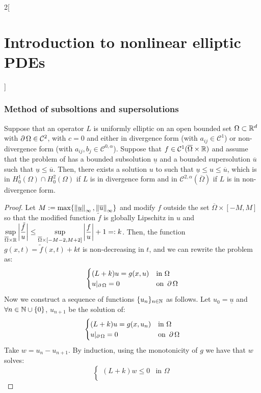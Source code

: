 \documentclass[../../../main_math.tex]{subfiles}
\begin{document}
\begin{multicols}{2}[\section{Introduction to nonlinear elliptic PDEs}]
  \subsubsection{Method of subsoltions and supersolutions}
  \begin{theorem}
    Suppose that an operator $L$ is uniformly elliptic on an open bounded set $\Omega\subset\RR^d$ with $\Fr{\Omega}\in \mathcal{C}^2$, with $c=0$ and either in divergence form (with $a_{ij}\in\mathcal{C}^1$) or non-divergence form (with $a_{ij},b_j\in\mathcal{C}^{0,\alpha}$). Suppose that $f\in\mathcal{C}^1(\overline{\Omega}\times \RR)$ and assume that the problem of  has a bounded subsolution $\underline{u}$ and a bounded supersolution $\overline{u}$ such that $\underline{u}\leq \overline{u}$. Then, there exists a solution $u$ to  such that $\underline{u}\leq u\leq \overline{u}$, which is in $H_0^1(\Omega)\cap H_0^2(\Omega)$ if $L$ is in divergence form and in $\mathcal{C}^{2,\alpha}(\overline{\Omega})$ if $L$ is in non-divergence form.
  \end{theorem}
  \begin{proof}
    Let $M:=\max\{\norm{\underline{u}}_\infty,\norm{\overline{u}}_\infty\}$ and modify $f$ outside the set $\overline{\Omega}\times [-M,M]$ so that the modified function $\tilde{f}$ is globally Lipschitz in $u$ and $\displaystyle\sup_{\overline{\Omega}\times \RR}\abs{\frac{\tilde{f}}{u}}\leq \sup_{\overline{\Omega}\times [-M-2,M+2]}\abs{\frac{f}{u}}+1=:k$. Then, the function $g(x,t)=\tilde{f}(x,t)+kt$ is non-decreasing in $t$, and we can rewrite the problem as:
    $$
      \begin{cases}
        (L+k)u=g(x,u)      & \text{in }\Omega      \\
        u|_{\Fr{\Omega}}=0 & \text{on }\Fr{\Omega}
      \end{cases}
    $$
    Now we construct a sequence of functions $\{u_n\}_{n\in\NN}$ as follows. Let $u_0=\underline{u}$ and $\forall n\in\NN\cup\{0\}$, $u_{n+1}$ be the solution of:
    $$
      \begin{cases}
        (L+k)u=g(x,u_n)    & \text{in }\Omega      \\
        u|_{\Fr{\Omega}}=0 & \text{on }\Fr{\Omega}
      \end{cases}
    $$
    Take $w=u_{n}-u_{n+1}$. By induction, using the monotonicity of $g$ we have that $w$ solves:
    $$
      \begin{cases}
        (L+k)w\leq 0           & \text{in }\Omega      \\

\end{cases}$$
\end{proof}
\end{multicols}
\end{document}
